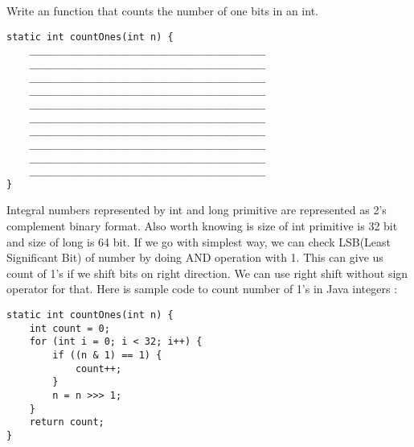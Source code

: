 \question Write an function that counts the number of one bits in an int.

\begin{lstlisting}
static int countOnes(int n) {
    _________________________________________
    _________________________________________
    _________________________________________
    _________________________________________
    _________________________________________
    _________________________________________
    _________________________________________
    _________________________________________
    _________________________________________
    _________________________________________
}
\end{lstlisting}
\fi

\begin{solution}
Integral numbers represented by int and long primitive are represented as 2's complement binary format. Also worth knowing is size of int primitive is 32 bit and size of long is 64 bit. If we go with simplest way, we can check LSB(Least Significant Bit) of number by doing AND operation with 1. This can give us count of 1's if we shift bits on right direction. We can use right shift without sign operator for that. Here is sample code to count number of 1's in Java integers :


\begin{lstlisting}
static int countOnes(int n) {
    int count = 0; 
    for (int i = 0; i < 32; i++) { 
        if ((n & 1) == 1) { 
            count++; 
        } 
        n = n >>> 1; 
    } 
    return count; 
}
\end{lstlisting}
\end{solution}